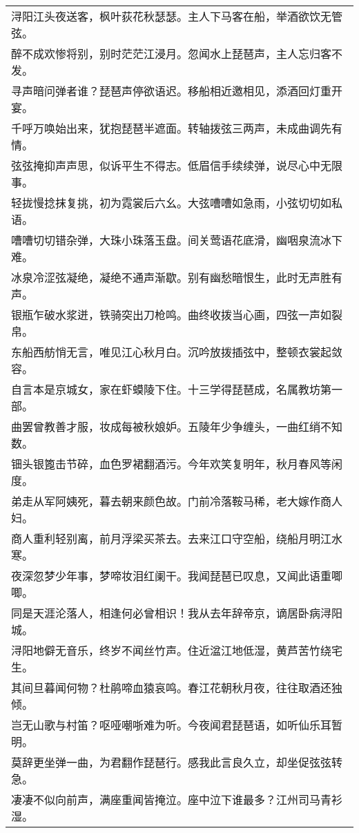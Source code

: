 \noindent\begin{minipage}{\linewidth}
  \vskip-3pt\begin{table}[H]
    \centering
    \begin{tabular}{@{}l@{}}
浔阳江头夜送客，枫叶荻花秋瑟瑟。主人下马客在船，举酒欲饮无管弦。\\
醉不成欢惨将别，别时茫茫江浸月。忽闻水上琵琶声，主人忘归客不发。\\
寻声暗问弹者谁？琵琶声停欲语迟。移船相近邀相见，添酒回灯重开宴。\\
千呼万唤始出来，犹抱琵琶半遮面。转轴拨弦三两声，未成曲调先有情。\\
弦弦掩抑声声思，似诉平生不得志。低眉信手续续弹，说尽心中无限事。\\
轻拢慢捻抹复挑，初为霓裳后六幺。大弦嘈嘈如急雨，小弦切切如私语。\\
嘈嘈切切错杂弹，大珠小珠落玉盘。间关莺语花底滑，幽咽泉流冰下难。\\
冰泉冷涩弦凝绝，凝绝不通声渐歇。别有幽愁暗恨生，此时无声胜有声。\\
银瓶乍破水浆迸，铁骑突出刀枪鸣。曲终收拨当心画，四弦一声如裂帛。\\
东船西舫悄无言，唯见江心秋月白。沉吟放拨插弦中，整顿衣裳起敛容。\\
自言本是京城女，家在虾蟆陵下住。十三学得琵琶成，名属教坊第一部。\\
曲罢曾教善才服，妆成每被秋娘妒。五陵年少争缠头，一曲红绡不知数。\\
钿头银篦击节碎，血色罗裙翻酒污。今年欢笑复明年，秋月春风等闲度。\\
弟走从军阿姨死，暮去朝来颜色故。门前冷落鞍马稀，老大嫁作商人妇。\\
商人重利轻别离，前月浮梁买茶去。去来江口守空船，绕船月明江水寒。\\
夜深忽梦少年事，梦啼妆泪红阑干。我闻琵琶已叹息，又闻此语重唧唧。\\
同是天涯沦落人，相逢何必曾相识！我从去年辞帝京，谪居卧病浔阳城。\\
浔阳地僻无音乐，终岁不闻丝竹声。住近湓江地低湿，黄芦苦竹绕宅生。\\
其间旦暮闻何物？杜鹃啼血猿哀鸣。春江花朝秋月夜，往往取酒还独倾。\\
岂无山歌与村笛？呕哑嘲哳难为听。今夜闻君琵琶语，如听仙乐耳暂明。\\
莫辞更坐弹一曲，为君翻作琵琶行。感我此言良久立，却坐促弦弦转急。\\
凄凄不似向前声，满座重闻皆掩泣。座中泣下谁最多？江州司马青衫湿。
    \end{tabular}
  \end{table}
\end{minipage}
\vspace{1cm}


